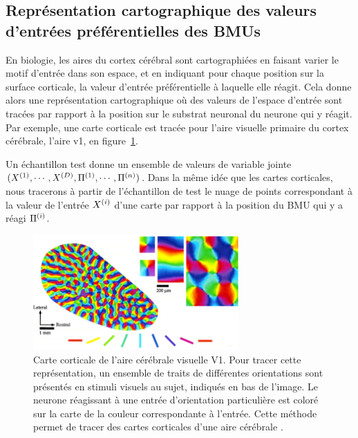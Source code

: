 \documentclass[../main]{subfiles}
\begin{document}
\subsection{Représentation cartographique des valeurs d'entrées préférentielles des BMUs}

En biologie, les aires du cortex cérébral sont cartographiées en faisant varier le motif d'entrée dans son espace, et en indiquant pour chaque position sur la surface corticale, la valeur d'entrée préférentielle à laquelle elle réagit. Cela donne alors une représentation cartographique où des valeurs de l'espace d'entrée sont tracées par rapport à la position sur le substrat neuronal du neurone qui y réagit.
Par exemple, une carte corticale est tracée pour l'aire visuelle primaire du cortex cérébrale, l'aire v1, en figure~\ref{fig:v1_repr}.

Un échantillon test donne un ensemble de valeurs de variable jointe $(X^{({1})}, \cdots, X^{({D})}, \Pi^{({1})},\cdots, \Pi^{({n})})$. Dans la même idée que les cartes corticales, nous tracerons à partir de l'échantillon de test le nuage de points correspondant à la valeur de l'entrée $X^{({i})}$ d'une carte par rapport à la position du BMU qui y a réagi $\Pi^{({i})}$.

\begin{figure}
    \centering
    \includegraphics[width=0.7\textwidth]{v1.jpg}
    \caption{Carte corticale de l'aire cérébrale visuelle V1. Pour tracer cette représentation, un ensemble de traits de différentes orientations sont présentés en stimuli visuels au sujet, indiqués en bas de l'image. Le neurone réagissant à une entrée d'orientation particulière est coloré sur la carte de la couleur correspondante à l'entrée. Cette méthode permet de tracer des cartes corticales d'une aire cérébrale \cite{Bosking1997OrientationSA}. \label{fig:v1_repr}}
\end{figure}
\end{document}
